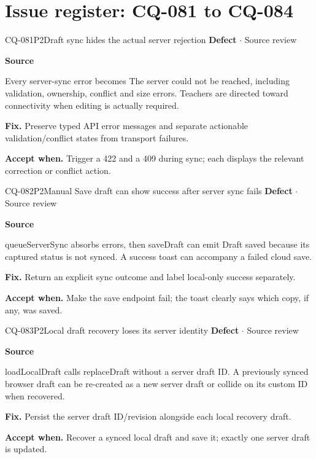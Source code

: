 \section*{Issue register: CQ-081 to CQ-084}
\begin{finding}{CQ-081}{P2}{Draft sync hides the actual server rejection}
\textbf{Defect} $\cdot$ Source review\par
\textbf{Source}\quad{}\par
Every server-sync error becomes The server could not be reached, including validation, ownership, conflict and size errors. Teachers are directed toward connectivity when editing is actually required.\par
\textbf{Fix.} Preserve typed API error messages and separate actionable validation/conflict states from transport failures.\par
\textbf{Accept when.} Trigger a 422 and a 409 during sync; each displays the relevant correction or conflict action.
\end{finding}
\begin{finding}{CQ-082}{P2}{Manual Save draft can show success after server sync fails}
\textbf{Defect} $\cdot$ Source review\par
\textbf{Source}\quad{}\par
queueServerSync absorbs errors, then saveDraft can emit Draft saved because its captured status is not synced. A success toast can accompany a failed cloud save.\par
\textbf{Fix.} Return an explicit sync outcome and label local-only success separately.\par
\textbf{Accept when.} Make the save endpoint fail; the toast clearly says which copy, if any, was saved.
\end{finding}
\begin{finding}{CQ-083}{P2}{Local draft recovery loses its server identity}
\textbf{Defect} $\cdot$ Source review\par
\textbf{Source}\quad{}\par
loadLocalDraft calls replaceDraft without a server draft ID. A previously synced browser draft can be re-created as a new server draft or collide on its custom ID when recovered.\par
\textbf{Fix.} Persist the server draft ID/revision alongside each local recovery draft.\par
\textbf{Accept when.} Recover a synced local draft and save it; exactly one server draft is updated.
\end{finding}
